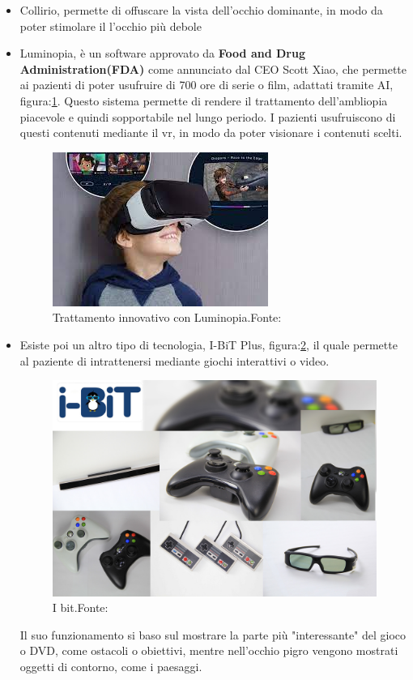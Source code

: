 \documentclass[
a4paper,
cleardoublepage=empty,
headings=twolinechapter,
numbers=autoenddot,
]{scrbook}
\begin{document}
\begin{itemize}
		\item Collirio, permette di offuscare la vista dell'occhio dominante, in modo da poter stimolare il l'occhio più debole
		
		\item Luminopia, è un software approvato da  \textbf{Food and Drug Administration(FDA)}\cite{Approvazione_luminopia} come annunciato dal CEO Scott Xiao, che permette ai pazienti di poter usufruire di 700 ore di serie o film, adattati tramite AI, figura:\ref{fig:luminopia}. Questo sistema permette di rendere il trattamento dell'ambliopia piacevole e quindi sopportabile nel lungo periodo.
		I pazienti usufruiscono di questi contenuti mediante il vr, in modo da poter visionare i contenuti scelti.
			\begin{figure}[h]
				\centering
				\includegraphics[width=0.5\linewidth]{image/luminopia}
				\caption{Trattamento innovativo con Luminopia.Fonte:\cite{Lumiopia_image}}
				\label{fig:luminopia}
			\end{figure}
	    \item Esiste poi un altro tipo di tecnologia, I-BiT Plus\cite{I-Bit}, figura:\ref{fig:I_bit}, il quale permette al paziente di intrattenersi mediante giochi interattivi o video.
		    \begin{figure}[h]
		    	\centering
		    	\includegraphics[width=0.5\linewidth]{image/I_bit}
		    	\caption{I bit.Fonte:\cite{I-Bit}}
		    	\label{fig:I_bit}
		    \end{figure}
	    Il suo funzionamento si baso sul mostrare la parte più "interessante" del gioco o DVD, come ostacoli o obiettivi, mentre nell'occhio pigro vengono mostrati oggetti di contorno, come i paesaggi.

\end{itemize}
\end{document}
